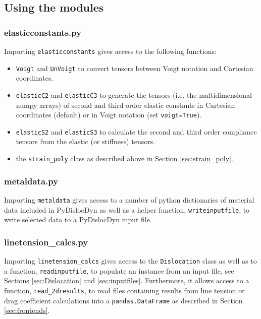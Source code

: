 \documentclass[11pt,letterpaper,oneside,pdftex]{article}
\begin{document}
\subsection{Using the modules}

\subsubsection{elasticconstants.py}

Importing \verb|elasticconstants| gives access to the following functions:
\begin{itemize}
\item \verb|Voigt| and \verb|UnVoigt| to convert tensors between Voigt notation and Cartesian coordinates.
\item \verb|elasticC2| and \verb|elasticC3| to generate the tensors (i.e. the multidimensional numpy arrays) of second and third order elastic constants in Cartesian coordinates (default) or in Voigt notation (set \verb|voigt=True|).
\item \verb|elasticS2| and \verb|elasticS3| to calculate the second and third order compliance tensors from the elastic (or stiffness) tensors.
\item the \verb|strain_poly| class as described above in Section \ref{sec:strain_poly}.
\end{itemize}


\subsubsection{metaldata.py}

Importing \verb|metaldata| gives access to a number of python dictionaries of material data included in PyDislocDyn as well as a helper function, \verb|writeinputfile|, to write selected data to a PyDislocDyn input file.


\subsubsection{linetension\_calcs.py}

Importing \verb|linetension_calcs| gives access to the \verb|Dislocation| class as well as to a function, \verb|readinputfile|, to populate an instance from an input file, see Sections \ref{sec:Dislocation} and \ref{sec:inputfiles}.
Furthermore, it allows access to a function, \verb|read_2dresults|, to read files containing results from line tension or drag coefficient calculations into a \verb|pandas.DataFrame| as described in Section \ref{sec:frontends}.
\end{document}
